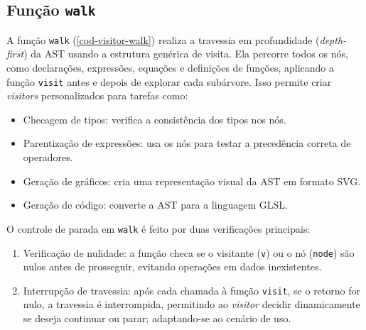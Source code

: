 \subsection{Função \texttt{walk}}
A função \texttt{walk} (\autoref{cod-visitor-walk}) realiza a travessia em profundidade (\textit{depth-first}) da AST usando a estrutura genérica de visita. Ela percorre todos os nós, como declarações, expressões, equações e definições de funções, aplicando a função \texttt{visit} antes e depois de explorar cada subárvore. Isso permite criar \textit{visitors} personalizados para tarefas como:

\begin{itemize}
    \item Checagem de tipos: verifica a consistência dos tipos nos nós.
    \item Parentização de expressões: usa os nós para testar a precedência correta de operadores.
    \item Geração de gráficos: cria uma representação visual da AST em formato SVG.
    \item Geração de código: converte a AST para a linguagem GLSL.
\end{itemize}

O controle de parada em \texttt{walk} é feito por duas verificações principais:

\begin{enumerate}
    \item Verificação de nulidade: a função checa se o visitante (\texttt{v}) ou o nó (\texttt{node}) são nulos antes de prosseguir, evitando operações em dados inexistentes.
    \item Interrupção de travessia: após cada chamada à função \texttt{visit}, se o retorno for nulo, a travessia é interrompida, permitindo ao \textit{visitor} decidir dinamicamente se deseja continuar ou parar; adaptando-se ao cenário de uso.
\end{enumerate}


